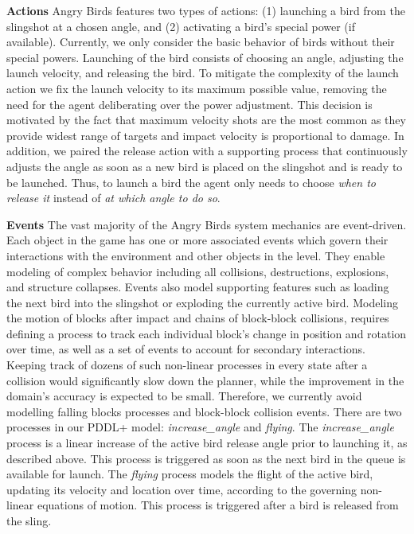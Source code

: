 \documentclass[letterpaper]{article}
\begin{document}
\noindent\textbf{Actions}
Angry Birds features two types of actions: (1) launching a bird from the slingshot at a chosen angle, and (2) activating a bird's special power (if available).
Currently, we only consider the basic behavior of birds without their special powers.
Launching of the bird consists of
choosing an angle, adjusting the launch velocity, and releasing the bird.
To mitigate the complexity of the launch action we fix the launch velocity to its maximum possible value, removing the need for the agent deliberating over the power adjustment.
This decision is motivated by the fact that maximum velocity shots are the most common as they provide widest range of targets and impact velocity is proportional to damage.
In addition, we paired the release action with a supporting process that continuously adjusts the angle as soon as a new bird is placed on the slingshot and is ready to be launched.
Thus, to launch a bird the agent only needs to choose \textit{when to release it} instead of \textit{at which angle to do so}.















\noindent\textbf{Events}
The vast majority of the Angry Birds system mechanics are event-driven.
Each object in the game has one or more associated events which govern their interactions with the environment and other objects in the level.
They enable modeling of complex behavior including all collisions, destructions, explosions, and structure collapses. Events also model supporting features such as loading the next bird into the slingshot or exploding the currently active bird.
Modeling the motion of blocks after impact and chains of block-block collisions, requires defining a process to track each individual block's change in position and rotation over time, as well as a set of events to account for secondary interactions.
Keeping track of dozens of such non-linear processes in every state after a collision would significantly slow down the planner, while the improvement in the domain's accuracy is expected to be small.
Therefore, we currently avoid modelling falling blocks processes and block-block collision events. %
There are two processes in our PDDL+ model: \textit{increase\_angle} and \textit{flying}.  The \textit{increase\_angle} process is a linear increase of the active bird release angle prior to launching it, as described above. This process is triggered as soon as the next bird in the queue is available for launch. %
The \textit{flying} process models the flight of the active bird, updating its velocity and location over time, according to the governing non-linear equations of motion. This process is triggered after a bird is released from the sling. %
\end{document}

